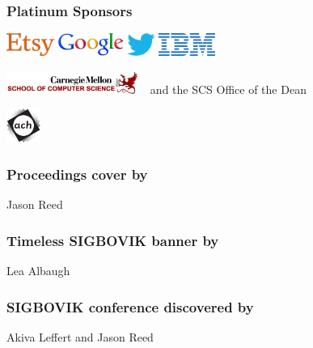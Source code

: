 \documentclass{beamer}
\begin{document}
\begin{frame}
\frametitle{Platinum Sponsors}
\includegraphics[height=2em]{etsy.png}
\qquad
\includegraphics[height=2em]{google.png}
\qquad
\includegraphics[height=2em]{twitter.png}
\qquad
\includegraphics[height=2em]{ibm.png}
\vspace{1em}

\includegraphics[height=2em]{scs.png}
~ and the SCS Office of the Dean
\vspace{1em}

\includegraphics[height=3em]{ach.png}
\end{frame}

\begin{frame}
\frametitle{Proceedings cover by}
Jason Reed
\end{frame}

\begin{frame}
\frametitle{Timeless SIGBOVIK banner by}
Lea Albaugh
\end{frame}

\begin{frame}
\frametitle{SIGBOVIK conference discovered by}
Akiva Leffert and Jason Reed
\end{frame}
\end{document}
